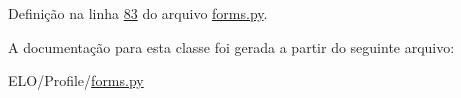Definição na linha \hyperlink{Profile_2forms_8py_source_l00083}{83} do arquivo \hyperlink{Profile_2forms_8py_source}{forms.\-py}.



A documentação para esta classe foi gerada a partir do seguinte arquivo\-:\begin{DoxyCompactItemize}
\item 
E\-L\-O/\-Profile/\hyperlink{Profile_2forms_8py}{forms.\-py}\end{DoxyCompactItemize}
